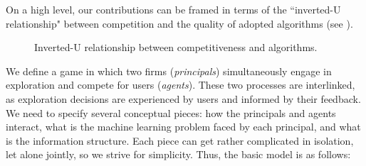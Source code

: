 On a high level, our contributions can be framed in terms of the ``inverted-U relationship" between competition and the quality of adopted algorithms (see ).

\begin{figure}
\begin{center}

\caption{Inverted-U relationship between competitiveness and algorithms.}
\label{fig:inverted-U}
\end{center}
\end{figure}






 We define a game in which two firms (\emph{principals}) simultaneously engage in exploration and compete for users (\emph{agents}). These two processes are interlinked, as exploration decisions are experienced by users and informed by their feedback. We need to specify several conceptual pieces: how the principals and agents interact, what is the machine learning problem faced by each principal, and what is the information structure. Each piece can get rather complicated in isolation, let alone jointly, so we strive for simplicity. Thus, the basic model is as follows:

